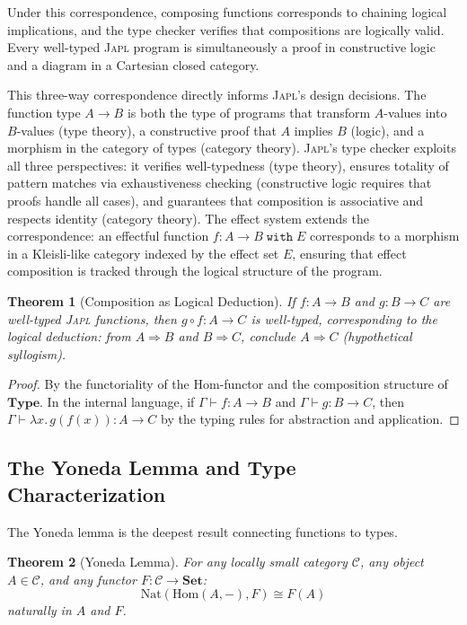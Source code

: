 \documentclass[11pt,a4paper]{article}
\newtheorem{theorem}{Theorem}[section]
\newcommand{\japl}{\textsc{Japl}}
\newcommand{\cat}[1]{\mathbf{#1}}
\newcommand{\Set}{\cat{Set}}
\newcommand{\Type}{\cat{Type}}
\newcommand{\Hom}{\mathrm{Hom}}
\newcommand{\Nat}{\mathrm{Nat}}
\begin{document}
Under this correspondence, composing functions corresponds to chaining logical implications, and the type checker verifies that compositions are logically valid. Every well-typed \japl{} program is simultaneously a proof in constructive logic and a diagram in a Cartesian closed category.

This three-way correspondence directly informs \japl{}'s design decisions. The function type $A \to B$ is both the type of programs that transform $A$-values into $B$-values (type theory), a constructive proof that $A$ implies $B$ (logic), and a morphism in the category of types (category theory). \japl{}'s type checker exploits all three perspectives: it verifies well-typedness (type theory), ensures totality of pattern matches via exhaustiveness checking (constructive logic requires that proofs handle all cases), and guarantees that composition is associative and respects identity (category theory). The effect system extends the correspondence: an effectful function $f : A \to B \;\texttt{with}\; E$ corresponds to a morphism in a Kleisli-like category indexed by the effect set $E$, ensuring that effect composition is tracked through the logical structure of the program.

\begin{theorem}[Composition as Logical Deduction]
\label{thm:composition-deduction}
If $f : A \to B$ and $g : B \to C$ are well-typed \japl{} functions, then $g \circ f : A \to C$ is well-typed, corresponding to the logical deduction: from $A \Rightarrow B$ and $B \Rightarrow C$, conclude $A \Rightarrow C$ (hypothetical syllogism).
\end{theorem}

\begin{proof}
By the functoriality of the Hom-functor and the composition structure of $\Type$. In the internal language, if $\Gamma \vdash f : A \to B$ and $\Gamma \vdash g : B \to C$, then $\Gamma \vdash \lambda x.\, g(f(x)) : A \to C$ by the typing rules for abstraction and application.
\end{proof}

\subsection{The Yoneda Lemma and Type Characterization}

The Yoneda lemma is the deepest result connecting functions to types.

\begin{theorem}[Yoneda Lemma]
\label{thm:yoneda}
For any locally small category $\mathcal{C}$, any object $A \in \mathcal{C}$, and any functor $F : \mathcal{C} \to \Set$:
\[
\Nat(\Hom(A, -), F) \cong F(A)
\]
naturally in $A$ and $F$.
\end{theorem}
\end{document}

